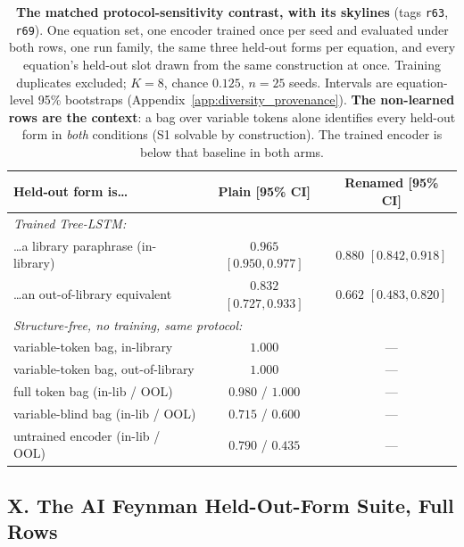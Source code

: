 \begin{table}[t]
\centering
\caption{\textbf{The matched protocol-sensitivity contrast, with its skylines} (tags \texttt{r63}, \texttt{r69}). One equation set, one encoder trained once per seed and evaluated under both rows, one run family, the same three held-out forms per equation, and every equation's held-out slot drawn from the same construction at once. Training duplicates excluded; $K{=}8$, chance $0.125$, $n{=}25$ seeds. Intervals are equation-level 95\% bootstraps (Appendix~\ref{app:diversity_provenance}). \textbf{The non-learned rows are the context}: a bag over variable tokens alone identifies every held-out form in \emph{both} conditions (S1 solvable by construction). The trained encoder is below that baseline in both arms.}
\label{tab:diversity_sweep}
\small
\begin{tabular}{l cc}
\toprule
Held-out form is\ldots & Plain [95\% CI] & Renamed [95\% CI] \\
\midrule
\multicolumn{3}{l}{\emph{Trained Tree-LSTM:}} \\
\ldots a library paraphrase (in-library)  & $0.965$ $[0.950, 0.977]$ & $0.880$ $[0.842, 0.918]$ \\
\ldots an out-of-library equivalent       & $0.832$ $[0.727, 0.933]$ & $0.662$ $[0.483, 0.820]$ \\
\midrule
\multicolumn{3}{l}{\emph{Structure-free, no training, same protocol:}} \\
\quad variable-token bag, in-library      & $\mathbf{1.000}$ & --- \\
\quad variable-token bag, out-of-library  & $\mathbf{1.000}$ & --- \\
\quad full token bag (in-lib / OOL)       & $0.980$ / $1.000$ & --- \\
\quad variable-blind bag (in-lib / OOL)   & $0.715$ / $0.600$ & --- \\
\quad untrained encoder (in-lib / OOL)    & $0.790$ / $0.435$ & --- \\
\bottomrule
\end{tabular}
\end{table}

\FloatBarrier
\subsection*{X. The AI Feynman Held-Out-Form Suite, Full Rows}


